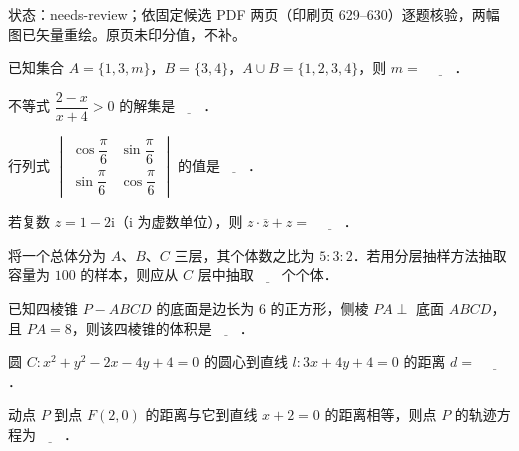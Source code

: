 

状态：needs-review；依固定候选 PDF 两页（印刷页 629–630）逐题核验，两幅图已矢量重绘。原页未印分值，不补。


\begin{question}
已知集合 $A=\{1,3,m\}$，$B=\{3,4\}$，$A\cup B=\{1,2,3,4\}$，则 $m=$ $\underline{\qquad}$．

\end{question}
\begin{question}
不等式 $\dfrac{2-x}{x+4}>0$ 的解集是$\underline{\qquad}$．

\end{question}
\begin{question}
行列式 $\begin{vmatrix}\cos\dfrac\pi6&\sin\dfrac\pi6\\ \sin\dfrac\pi6&\cos\dfrac\pi6\end{vmatrix}$ 的值是$\underline{\qquad}$．

\end{question}
\begin{question}
若复数 $z=1-2\mathrm i$（$\mathrm i$ 为虚数单位），则 $z\cdot\overline z+z=$ $\underline{\qquad}$．

\end{question}
\begin{question}
将一个总体分为 $A$、$B$、$C$ 三层，其个体数之比为 $5:3:2$．若用分层抽样方法抽取容量为 $100$ 的样本，则应从 $C$ 层中抽取$\underline{\qquad}$个个体．

\end{question}
\begin{question}
已知四棱锥 $P-ABCD$ 的底面是边长为 $6$ 的正方形，侧棱 $PA\perp$ 底面 $ABCD$，且 $PA=8$，则该四棱锥的体积是$\underline{\qquad}$．

\end{question}
\begin{question}
圆 $C:x^2+y^2-2x-4y+4=0$ 的圆心到直线 $l:3x+4y+4=0$ 的距离 $d=$ $\underline{\qquad}$．

\end{question}
\begin{question}
动点 $P$ 到点 $F(2,0)$ 的距离与它到直线 $x+2=0$ 的距离相等，则点 $P$ 的轨迹方程为$\underline{\qquad}$．

\end{question}
